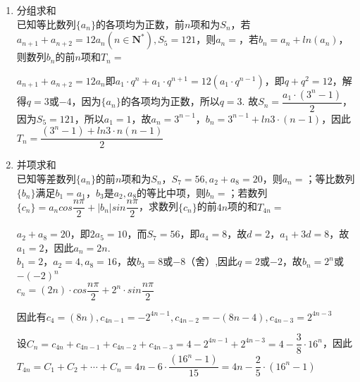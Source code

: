 \begin{enumerate}
\begin{enumerate}
        \item 分组求和\\
        已知等比数列$\{a_n\}$的各项均为正数，前$n$项和为$S_n$，若$a_{n+1} + a_{n+2} = 12a_n(n \in \mathbf{N^*}), S_5 = 121$，则$a_n = $，若$b_n = a_n + ln (a_n)$，则数列$b_n$的前$n$项和$T_n = $
        \begin{jieda}
            $a_{n+1} + a_{n+2} = 12a_n$即$a_1 \cdot q^n + a_1 \cdot q^{n+1} = 12(a_1 \cdot q^{n-1})$，即$q + q^2 = 12$，解得$q = 3$或$-4$，因为$\{a_n\}$的各项均为正数，所以$q = 3$. 故$S_n = \dfrac{a_1 \cdot (3^n - 1)}{2}$，因为$S_5 = 121$，所以$a_1 = 1$，故$a_n = 3^{n-1}$，$b_n = 3^{n-1} + ln3 \cdot (n-1)$，因此$T_n = \dfrac{(3^n - 1) + ln3 \cdot n(n-1)}{2}$
        \end{jieda}
        \item 并项求和 \\
        已知等差数列$\{a_n\}$的前$n$项和为$S_n$，$S_7 = 56, a_2 + a_8 = 20$，则$a_n = $；等比数列$\{b_n\}$满足$b_1 = a_1$，$b_3$是$a_2, a_8$的等比中项，则$b_n = $；若数列$\{c_n\} = a_n cos\dfrac{n\pi}{2} + |b_n|sin\dfrac{n\pi}{2}$，求数列$\{c_n\}$的前$4n$项的和$T_{4n} = $
        \begin{jieda}
            $a_2 + a_8 = 20$，即$2a_5 = 10$，而$S_7 = 56$，即$a_4=8$，故$d = 2$，$a_1 + 3d = 8$，故$a_1 = 2$，因此$a_n = 2n$. \\
            $b_1 = 2$，$a_2 = 4, a_8 = 16$，故$b_3 = 8$或$-8$（舍）,因此$q = 2$或$-2$，故$b_n = 2^n$或$-(-2)^n$ \\
            $c_n = (2n) \cdot cos\dfrac{n\pi}{2} + 2^n \cdot sin\dfrac{n\pi}{2}$
            
            因此有$c_{4} = (8n), c_{4n-1} = -2^{4n-1}, c_{4n-2} = -(8n-4), c_{4n-3} = 2^{4n-3}$
            
            设$C_n = c_{4n} + c_{4n-1} + c_{4n-2} + c_{4n-3} = 4 - 2^{4n-1} + 2^{4n-3} = 4 - \dfrac{3}{8} \cdot 16^n$，因此$T_{4n} = C_1 + C_2 + \cdots + C_n = 4n - 6 \cdot \dfrac{(16^n - 1)}{15} = 4n - \dfrac{2}{5} \cdot (16^n - 1)$
        \end{jieda}
    \end{enumerate}

    
    
\end{enumerate}
